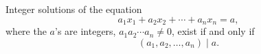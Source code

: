 \begin{proposition}
Integer solutions of the equation
\[
    a_1x_1+a_2x_2+\cdots+a_nx_n=a,
\]
where the $a$'s are integers, $a_1a_2\cdots a_n\ne0$, exist if and only if
\[
    (a_1,a_2,\ldots,a_n)\mid a.
\]
\end{proposition}
